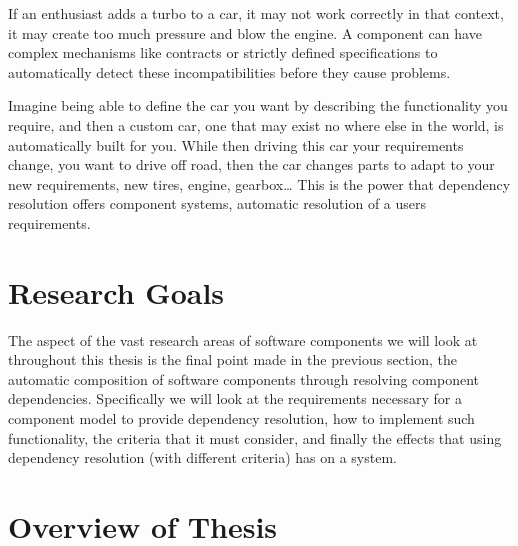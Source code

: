 \documentclass{report}
\begin{document}
If an enthusiast adds a turbo to a car, it may not work correctly in that context, it may create too much pressure and blow the engine.
A component can have complex mechanisms like contracts or strictly defined specifications to automatically detect these incompatibilities before they cause problems.

Imagine being able to define the car you want by describing the functionality you require, and then a custom car, one that may exist no where else in the world,
is automatically built for you. 
While then driving this car your requirements change, you want to drive off road, then the car changes parts to adapt to your new requirements, new tires, engine, gearbox\ldots
This is the power that dependency resolution offers component systems, automatic resolution of a users requirements.

\section{Research Goals}
{}The aspect of the vast research areas of software components we will look at throughout this thesis is the final point made in the previous section, 
{}the automatic composition of software components through resolving component dependencies.
{}Specifically we will look at the requirements necessary for a component model to provide dependency resolution,
{}how to implement such functionality, the criteria that it must consider, and finally the effects that using dependency resolution (with different criteria) has on a system. 





\section{Overview of Thesis}
















\end{document}
